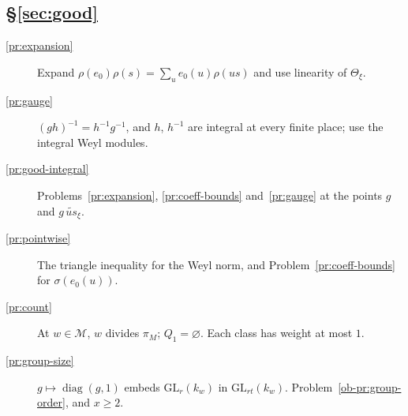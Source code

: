 \documentclass[reqno]{amsart}
\theoremstyle{definition}
\theoremstyle{plain}
\theoremstyle{definition}
\newcommand{\diag}{\operatorname{diag}}
\begin{document}
\subsection*{\S\ref{sec:good}}
\begin{description}
\item[\ref{pr:expansion}] Expand \(\rho(e_0)\rho(s) = \sum_u e_0(u)\rho(us)\) and use linearity of \(\Theta_\xi\).
\item[\ref{pr:gauge}] \((gh)^{-1} = h^{-1}g^{-1}\), and \(h\), \(h^{-1}\) are integral at every finite place; use the integral Weyl modules.
\item[\ref{pr:good-integral}] Problems~\ref{pr:expansion}, \ref{pr:coeff-bounds} and~\ref{pr:gauge} at the points \(g\) and \(g\,\widetilde{us}_\xi\).
\item[\ref{pr:pointwise}] The triangle inequality for the Weyl norm, and Problem~\ref{pr:coeff-bounds} for \(\sigma(e_0(u))\).
\item[\ref{pr:count}] At \(w \in \mathcal M\), \(w\) divides \(\pi_M\); \(Q_1 = \varnothing\).  Each class has weight at most \(1\).
\item[\ref{pr:group-size}] \(g \mapsto \diag(g, 1)\) embeds \(\mathrm{GL}_r(k_w)\) in \(\mathrm{GL}_{rt}(k_w)\).  Problem~\ref{ob-pr:group-order}, and \(x \ge 2\).
\end{description}
\end{document}
